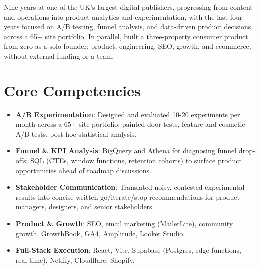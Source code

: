 \documentclass[11pt,a4paper,sans]{moderncv}
\begin{document}
\makecvtitle


\vspace{6pt}
\small{Nine years at one of the UK's largest digital publishers, progressing from content and operations into product analytics and experimentation, with the last four years focused on A/B testing, funnel analysis, and data-driven product decisions across a 65+ site portfolio. In parallel, built a three-property consumer product from zero as a solo founder: product, engineering, SEO, growth, and ecommerce, without external funding or a team.}


\section{Core Competencies}
\vspace{1pt}
\begin{itemize}

\item \textbf{A/B Experimentation}: Designed and evaluated 10-20 experiments per month across a 65+ site portfolio; painted door tests, feature and cosmetic A/B tests, post-hoc statistical analysis.

\item \textbf{Funnel \& KPI Analysis}: BigQuery and Athena for diagnosing funnel drop-offs; SQL (CTEs, window functions, retention cohorts) to surface product opportunities ahead of roadmap discussions.

\item \textbf{Stakeholder Communication}: Translated noisy, contested experimental results into concise written go/iterate/stop recommendations for product managers, designers, and senior stakeholders.

\item \textbf{Product \& Growth}: SEO, email marketing (MailerLite), community growth, GrowthBook, GA4, Amplitude, Looker Studio.

\item \textbf{Full-Stack Execution}: React, Vite, Supabase (Postgres, edge functions, real-time), Netlify, Cloudflare, Shopify.

\end{itemize}
\end{document}
